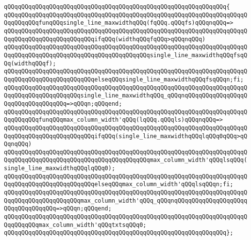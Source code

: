 \verb|qQQqqQQqqQQqqQQqqQQqqQQqqQQqqQQqqQQqqQQqqQQqqQQqqQQqqQQqqQQqqQQq{|\newline
\verb|qQQqqQQqqQQqqQQqqQQqqQQqqQQqqQQqqQQqqQQqqQQqqQQqqQQqqQQqqQQqqQQqqQQqqQQqqQQqqQQqfunqQQqsingle_line_maxwidthqQQq(fqQQq.qQQqfs)qQQqnqQQq=>|\newline
\verb|qQQqqQQqqQQqqQQqqQQqqQQqqQQqqQQqqQQqqQQqqQQqqQQqqQQqqQQqqQQqqQQqqQQqqQQqqQQqqQQqqQQqqQQqqQQqqQQqifqQQq(widthqQQqfqQQq>qQQqnqQQq)|\newline
\verb|qQQqqQQqqQQqqQQqqQQqqQQqqQQqqQQqqQQqqQQqqQQqqQQqqQQqqQQqqQQqqQQqqQQqqQQqqQQqqQQqqQQqqQQqqQQqqQQqqQQqqQQqqQQqqQQqsingle_line_maxwidthqQQqfsqQQq(widthqQQqf);|\newline
\verb|qQQqqQQqqQQqqQQqqQQqqQQqqQQqqQQqqQQqqQQqqQQqqQQqqQQqqQQqqQQqqQQqqQQqqQQqqQQqqQQqqQQqqQQqqQQqqQQqelseqQQqsingle_line_maxwidthqQQqfsqQQqn;fi;|\newline
\verb|qQQqqQQqqQQqqQQqqQQqqQQqqQQqqQQqqQQqqQQqqQQqqQQqqQQqqQQqqQQqqQQqqQQqqQQqqQQqqQQqqQQqqQQqqQQqsingle_line_maxwidthqQQq_qQQqnqQQqqQQqqQQqqQQqqQQqqQQqqQQqqQQqqQQq=>qQQqn;qQQqend;|\newline
\newline
\verb|qQQqqQQqqQQqqQQqqQQqqQQqqQQqqQQqqQQqqQQqqQQqqQQqqQQqqQQqqQQqqQQqqQQqqQQqqQQqqQQqfunqQQqmax_column_width'qQQq(lqQQq.qQQqls)qQQqnqQQq=>|\newline
\verb|qQQqqQQqqQQqqQQqqQQqqQQqqQQqqQQqqQQqqQQqqQQqqQQqqQQqqQQqqQQqqQQqqQQqqQQqqQQqqQQqqQQqqQQqqQQqqQQqifqQQq(single_line_maxwidthqQQqlqQQq0qQQq>qQQqnqQQq)|\newline
\verb|qQQqqQQqqQQqqQQqqQQqqQQqqQQqqQQqqQQqqQQqqQQqqQQqqQQqqQQqqQQqqQQqqQQqqQQqqQQqqQQqqQQqqQQqqQQqqQQqqQQqqQQqqQQqqQQqmax_column_width'qQQqlsqQQq(single_line_maxwidthqQQqlqQQq0);|\newline
\verb|qQQqqQQqqQQqqQQqqQQqqQQqqQQqqQQqqQQqqQQqqQQqqQQqqQQqqQQqqQQqqQQqqQQqqQQqqQQqqQQqqQQqqQQqqQQqqQQqelseqQQqmax_column_width'qQQqlsqQQqn;fi;|\newline
\verb|qQQqqQQqqQQqqQQqqQQqqQQqqQQqqQQqqQQqqQQqqQQqqQQqqQQqqQQqqQQqqQQqqQQqqQQqqQQqqQQqqQQqqQQqqQQqmax_column_width'qQQq_qQQqnqQQqqQQqqQQqqQQqqQQqqQQqqQQqqQQqqQQq=>qQQqn;qQQqend;|\newline
\newline
\verb|qQQqqQQqqQQqqQQqqQQqqQQqqQQqqQQqqQQqqQQqqQQqqQQqqQQqqQQqqQQqqQQqqQQqqQQqqQQqqQQqmax_column_width'qQQqtxtsqQQq0;|\newline
\verb|qQQqqQQqqQQqqQQqqQQqqQQqqQQqqQQqqQQqqQQqqQQqqQQqqQQqqQQqqQQqqQQq};|\newline
\newline
